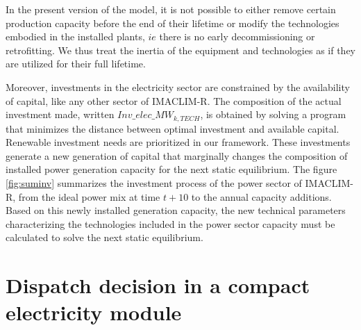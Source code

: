 In the present version of the model, it is not possible to either remove certain production capacity before the end of their lifetime or modify the technologies embodied in the installed plants, $ie$ there is no early decommissioning or retrofitting. We thus treat the inertia of the equipment and technologies as if they are utilized for their full lifetime.

Moreover, investments in the electricity sector are constrained by the availability of capital, like any other sector of IMACLIM-R. The composition of the actual investment made, written $Inv\_elec\_MW_{k,TECH}$, is obtained by solving a program that minimizes the distance between optimal investment and available capital. Renewable investment needs are prioritized in our framework.
These investments generate a new generation of capital that marginally changes the composition of installed power generation capacity for the next static equilibrium. The figure \ref{fig:suminv} summarizes the investment process of the power sector of IMACLIM-R, from the ideal power mix at time $t+10$ to the annual capacity additions.
Based on this newly installed generation capacity, the new technical parameters characterizing the technologies included in the power sector capacity must be calculated to solve the next static equilibrium.



\section{Dispatch decision in a compact electricity module}




